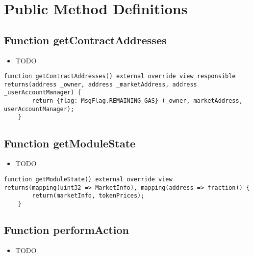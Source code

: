 \section{Public Method Definitions}


\subsection{Function getContractAddresses}

\noindent\begin{itemize}
\item TODO
\end{itemize}

\begin{lstlisting}[firstnumber=80]
    function getContractAddresses() external override view responsible returns(address _owner, address _marketAddress, address _userAccountManager) {
        return {flag: MsgFlag.REMAINING_GAS} (_owner, marketAddress, userAccountManager);
    }
\end{lstlisting}

\subsection{Function getModuleState}

\noindent\begin{itemize}
\item TODO
\end{itemize}

\begin{lstlisting}[firstnumber=64]
    function getModuleState() external override view returns(mapping(uint32 => MarketInfo), mapping(address => fraction)) {
        return(marketInfo, tokenPrices);
    }
\end{lstlisting}

\subsection{Function performAction}

\noindent\begin{itemize}
\item TODO
\end{itemize}

